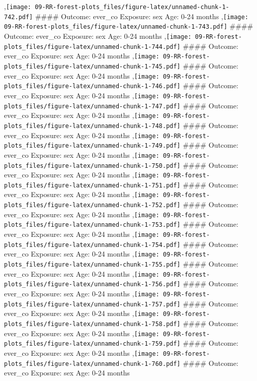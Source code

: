 \documentclass[
  9pt,
]{book}
\begin{document}
,\texttt{[image: 09-RR-forest-plots\_files/figure-latex/unnamed-chunk-1-742.pdf]}
\#\#\#\# Outcome: ever\_co Exposure: sex Age: 0-24 months
,\texttt{[image: 09-RR-forest-plots\_files/figure-latex/unnamed-chunk-1-743.pdf]}
\#\#\#\# Outcome: ever\_co Exposure: sex Age: 0-24 months
,\texttt{[image: 09-RR-forest-plots\_files/figure-latex/unnamed-chunk-1-744.pdf]}
\#\#\#\# Outcome: ever\_co Exposure: sex Age: 0-24 months
,\texttt{[image: 09-RR-forest-plots\_files/figure-latex/unnamed-chunk-1-745.pdf]}
\#\#\#\# Outcome: ever\_co Exposure: sex Age: 0-24 months
,\texttt{[image: 09-RR-forest-plots\_files/figure-latex/unnamed-chunk-1-746.pdf]}
\#\#\#\# Outcome: ever\_co Exposure: sex Age: 0-24 months
,\texttt{[image: 09-RR-forest-plots\_files/figure-latex/unnamed-chunk-1-747.pdf]}
\#\#\#\# Outcome: ever\_co Exposure: sex Age: 0-24 months
,\texttt{[image: 09-RR-forest-plots\_files/figure-latex/unnamed-chunk-1-748.pdf]}
\#\#\#\# Outcome: ever\_co Exposure: sex Age: 0-24 months
,\texttt{[image: 09-RR-forest-plots\_files/figure-latex/unnamed-chunk-1-749.pdf]}
\#\#\#\# Outcome: ever\_co Exposure: sex Age: 0-24 months
,\texttt{[image: 09-RR-forest-plots\_files/figure-latex/unnamed-chunk-1-750.pdf]}
\#\#\#\# Outcome: ever\_co Exposure: sex Age: 0-24 months
,\texttt{[image: 09-RR-forest-plots\_files/figure-latex/unnamed-chunk-1-751.pdf]}
\#\#\#\# Outcome: ever\_co Exposure: sex Age: 0-24 months
,\texttt{[image: 09-RR-forest-plots\_files/figure-latex/unnamed-chunk-1-752.pdf]}
\#\#\#\# Outcome: ever\_co Exposure: sex Age: 0-24 months
,\texttt{[image: 09-RR-forest-plots\_files/figure-latex/unnamed-chunk-1-753.pdf]}
\#\#\#\# Outcome: ever\_co Exposure: sex Age: 0-24 months
,\texttt{[image: 09-RR-forest-plots\_files/figure-latex/unnamed-chunk-1-754.pdf]}
\#\#\#\# Outcome: ever\_co Exposure: sex Age: 0-24 months
,\texttt{[image: 09-RR-forest-plots\_files/figure-latex/unnamed-chunk-1-755.pdf]}
\#\#\#\# Outcome: ever\_co Exposure: sex Age: 0-24 months
,\texttt{[image: 09-RR-forest-plots\_files/figure-latex/unnamed-chunk-1-756.pdf]}
\#\#\#\# Outcome: ever\_co Exposure: sex Age: 0-24 months
,\texttt{[image: 09-RR-forest-plots\_files/figure-latex/unnamed-chunk-1-757.pdf]}
\#\#\#\# Outcome: ever\_co Exposure: sex Age: 0-24 months
,\texttt{[image: 09-RR-forest-plots\_files/figure-latex/unnamed-chunk-1-758.pdf]}
\#\#\#\# Outcome: ever\_co Exposure: sex Age: 0-24 months
,\texttt{[image: 09-RR-forest-plots\_files/figure-latex/unnamed-chunk-1-759.pdf]}
\#\#\#\# Outcome: ever\_co Exposure: sex Age: 0-24 months
,\texttt{[image: 09-RR-forest-plots\_files/figure-latex/unnamed-chunk-1-760.pdf]}
\#\#\#\# Outcome: ever\_co Exposure: sex Age: 0-24 months
\end{document}
